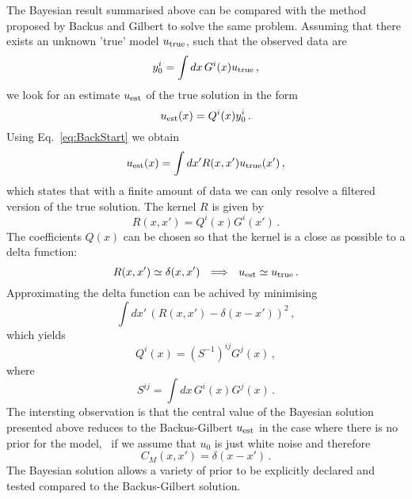 The Bayesian result summarised above can be compared with the method proposed by Backus and Gilbert to solve the same problem. Assuming that there exists an unknown 'true' model $u_\mathrm{true}$, such that the observed data are
\begin{equation}
  \label{eq:BackStart}
  y_0^i = \int dx\, G^i(x) u_\mathrm{true}\, ,
\end{equation}
we look for an estimate $u_\mathrm{est}$ of the true solution in the form
\begin{equation}
  \label{eq:BackAnsatz}
  u_\mathrm{est}(x) = Q^i(x) y^i_0\, .
\end{equation}
Using Eq.~\ref{eq:BackStart} we obtain
\begin{equation}
  \label{eq:BackFilter}
  u_\mathrm{est}(x) = \int dx' R(x,x') u_\mathrm{true}(x')\, , 
\end{equation}
which states that with a finite amount of data we can only resolve a filtered
version of the true solution. The kernel $R$ is given by
\begin{equation}
  \label{eq:BackKernel}
  R(x,x') = Q^i(x) G^i(x')\, .
\end{equation}
The coefficients $Q(x)$ can be chosen so that the kernel is a close as possible
to a delta function:
\begin{equation}
  \label{eq:BackDelta}
  R(x,x') \simeq \delta(x,x') ~~ \Longrightarrow ~~
  u_\mathrm{est} \simeq u_\mathrm{true}\, .
\end{equation}
Approximating the delta function can be achived by minimising 
\begin{equation}
  \label{eq:BackDeltaness}
  \int dx'\, \left(
    R(x,x') - \delta(x-x')
  \right)^2\, ,
\end{equation}
which yields
\begin{equation}
  \label{eq:BackSolution}
  Q^i(x) = \left(S^{-1}\right)^{ij} G^j(x)\, ,
\end{equation}
where 
\begin{equation}
  \label{eq:BackSMatrix}
  S^{ij} = \int dx\, G^i(x) G^j(x)\, .
\end{equation}
The intersting observation is that the central value of the Bayesian solution
presented above reduces to the Backus-Gilbert $u_\mathrm{est}$ in the case where there is
no prior for the model, \ie\ if we assume that $u_0$ is just white noise and
therefore
\begin{equation}
  \label{eq:BackComparison}
  C_M(x,x') = \delta(x-x')\, .
\end{equation}
The Bayesian solution allows a variety of prior to be explicitly declared and
tested compared to the Backus-Gilbert solution. 